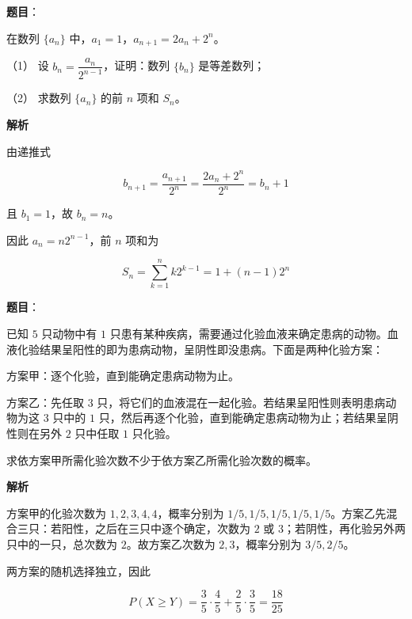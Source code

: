 \begin{answer}

\textbf{题目}：

在数列 $\{a_n\}$ 中，$a_1=1$，$a_{n+1}=2a_n+2^n$。

（1） 设 $b_n=\dfrac{a_n}{2^{n-1}}$，证明：数列 $\{b_n\}$ 是等差数列；

（2） 求数列 $\{a_n\}$ 的前 $n$ 项和 $S_n$。

\textbf{解析}


由递推式

\nopagebreak[4]
\[
b_{n+1}=\frac{a_{n+1}}{2^n}=\frac{2a_n+2^n}{2^n}=b_n+1
\]

且 $b_1=1$，故 $b_n=n$。


因此 $a_n=n2^{n-1}$，前 $n$ 项和为

\nopagebreak[4]
\[
S_n=\sum_{k=1}^n k2^{k-1}=1+(n-1)2^n
\]



\end{answer}
\begin{answer}

\textbf{题目}：

已知 $5$ 只动物中有 $1$ 只患有某种疾病，需要通过化验血液来确定患病的动物。血液化验结果呈阳性的即为患病动物，呈阴性即没患病。下面是两种化验方案：

方案甲：逐个化验，直到能确定患病动物为止。

方案乙：先任取 $3$ 只，将它们的血液混在一起化验。若结果呈阳性则表明患病动物为这 $3$ 只中的 $1$ 只，然后再逐个化验，直到能确定患病动物为止；若结果呈阴性则在另外 $2$ 只中任取 $1$ 只化验。

求依方案甲所需化验次数不少于依方案乙所需化验次数的概率。

\textbf{解析}

方案甲的化验次数为 $1,2,3,4,4$，概率分别为 $1/5,1/5,1/5,1/5,1/5$。方案乙先混合三只：若阳性，之后在三只中逐个确定，次数为 $2$ 或 $3$；若阴性，再化验另外两只中的一只，总次数为 $2$。故方案乙次数为 $2,3$，概率分别为 $3/5,2/5$。

两方案的随机选择独立，因此

\nopagebreak[4]
\[
P(X\geqslant Y)=\frac35\cdot\frac45+\frac25\cdot\frac35=\frac{18}{25}
\]


\end{answer}
